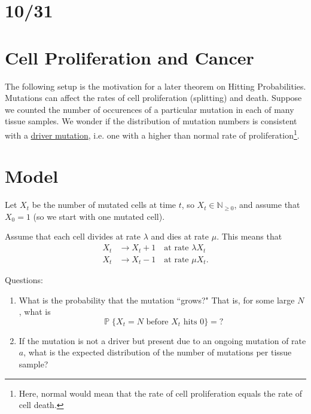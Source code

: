 \documentclass{article}
\theoremstyle{definition}
\DeclareMathOperator{\p}{\mathbb{P}}
\begin{document}
\section*{10/31}
\section*{Cell Proliferation and Cancer}
The following setup is the motivation for a later theorem on Hitting Probabilities. Mutations can affect the rates of cell proliferation (splitting) and death. Suppose we counted the number of occurences of a particular mutation in each of many tissue samples. We wonder if the distribution of mutation numbers is consistent with a \underline{driver mutation}, i.e. one with a higher than normal rate of proliferation\footnote{Here, normal would mean that the rate of cell proliferation equals the rate of cell death.}.


\section*{Model}
Let $X_t$ be the number of mutated cells at time $t$, so $X_t \in \mathbb{N}_{\geq 0}$, and assume that $X_0 =1$ (so we start with one mutated cell). 

Assume that each cell divides at rate $\lambda$ and dies at rate $\mu$. This means that
\begin{align*}
	X_t &\to X_t + 1 \quad \text{at rate $\lambda X_t$}\\
	X_t & \to X_t - 1 \quad \text{at rate $\mu X_t$}.
\end{align*}

Questions:
\begin{enumerate}
	\item What is the probability that the mutation ``grows?" That is, for some large $N$, what is 
	\[
		\p\{X_t = N \text{ before } X_t \text{ hits } 0 \}= ?
	\]
	\item If the mutation is not a driver but present due to an ongoing mutation of rate $a$, what is the expected distribution of the number of mutations per tissue sample?
\end{enumerate}
\end{document}
